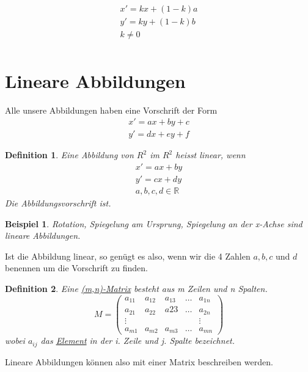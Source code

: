 \documentclass[a4paper,10pt]{report}
\newtheorem{mydef}{Definition}
\newtheorem{myexample}{Beispiel}
\newenvironment{mathbox}
{\par\smallskip\centering\begin{lrbox}{0}%
\begin{minipage}[c]{\textwidth}}
{\end{minipage}\end{lrbox}%
\framebox[\textwidth]{\usebox{0}}%
\par\medskip
\ignorespacesafterend}
\begin{document}
\begin{enumerate}
\begin{eqnarray*}
	\end{eqnarray*}
	\begin{mathbox}
		\begin{eqnarray*}
			x' = kx + (1-k)a\\
			y' = ky + (1-k)b\\
			k \not = 0\\
		\end{eqnarray*}
	\end{mathbox}
\end{enumerate}\clearpage
\section{Lineare Abbildungen}
Alle unsere Abbildungen haben eine Vorschrift der Form
\begin{eqnarray*}
	x' = ax + by + c\\
	y' = dx + ey + f
\end{eqnarray*}
\begin{mydef}
	Eine Abbildung von $R^2$ im $R^2$ heisst linear, wenn
	\begin{eqnarray*}
		x' = ax + by\\
		y' = cx + dy\\
		a,b,c,d \in \mathbb{R}
	\end{eqnarray*}
	Die Abbildungsvorschrift ist.
\end{mydef}
\begin{myexample}
	Rotation, Spiegelung am Ursprung, Spiegelung an der x-Achse sind lineare Abbildungen.
\end{myexample}
Ist die Abbildung linear, so genügt es also, wenn wir die 4 Zahlen $a,b,c$ und $d$ benennen um die Vorschrift zu finden.
\begin{mydef}
	Eine \underline{(m,n)-Matrix} besteht aus m Zeilen und n Spalten.
	\begin{equation*}
		M = \begin{pmatrix}
				a_{11} & a_{12}& a_{13} & \ldots & a_{1n}\\
				a_{21} &a_{22} & a{23}  & \ldots  & a_{2n}\\
				\vdots & & & & \vdots\\
				a_{m1} & a_{m2} & a_{m3} & \ldots & a_{mn}
			\end{pmatrix}
	\end{equation*}
	wobei $a_{ij}$ das \underline{Element} in der i. Zeile und j. Spalte bezeichnet.\\
\end{mydef}
\noindent
Lineare Abbildungen können also mit einer Matrix beschreiben werden.\\
\end{document}
